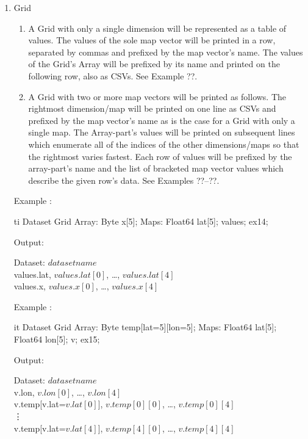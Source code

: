 \documentclass{article}
\begin{document}
\begin{enumerate}
\item Grid
\begin{enumerate}
\item A Grid with only a single dimension will be represented as a table of
  values. The values of the sole map vector will be printed in a row,
  separated by commas and prefixed by the map vector's name. The values of
  the Grid's Array will be prefixed by its name and printed on the following
  row, also as CSVs. See Example ??.
\item A Grid with two or more map vectors will be printed as follows. The
  rightmost dimension/map will be printed on one line as CSVs and prefixed
  by the map vector's name as is the case for a Grid with only a single map.
  The Array-part's values will be printed on subsequent lines which enumerate
  all of the indices of the other dimensions/maps so that the rightmost
  varies fastest. Each row of values will be prefixed by the array-part's
  name and the list of bracketed map vector values which describe the given
  row's data. See Examples ??--??.
\end{enumerate}

\T\begin{minipage}{5in}
Example :
\T\medskip

\begin{vcode}{ti}
Dataset {
  Grid {
    Array:
      Byte x[5];
    Maps:
      Float64 lat[5];
  } values;
} ex14;
\end{vcode}
\T\medskip

Output:\\
\begin{ttfamily}
Dataset: $dataset name$\\
values.lat, $values.lat[0]$, \ldots, $values.lat[4]$\\
values.x, $values.x[0]$, \ldots, $values.x[4]$
\end{ttfamily}
\T\end{minipage}
\T\bigskip

\T\begin{minipage}{5in}
Example :
\T\medskip

\begin{vcode}{it}
Dataset {
  Grid {
    Array: 
      Byte temp[lat=5][lon=5];
    Maps:
      Float64 lat[5];
      Float64 lon[5];
  } v;
} ex15;
\end{vcode}
\T\medskip

Output:\\
\begin{ttfamily}
Dataset: $dataset name$\\
v.lon, $v.lon[0]$, \ldots, $v.lon[4]$\\
v.temp[v.lat=$v.lat[0]$], $v.temp[0][0]$, \ldots, $v.temp[0][4]$\\
\vdots\\
v.temp[v.lat=$v.lat[4]$], $v.temp[4][0]$, \ldots, $v.temp[4][4]$
\end{ttfamily}
\T\end{minipage}
\T\bigskip


\end{enumerate}
\end{document}
